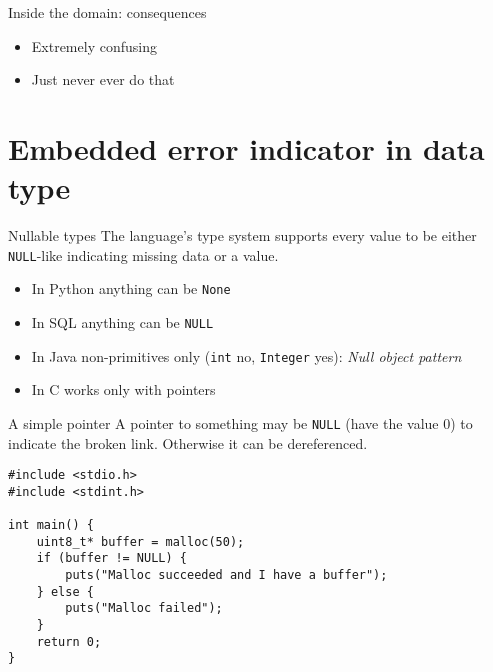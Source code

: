 \documentclass[aspectratio=169,14pt]{beamer}
\begin{document}
\begin{frame}[fragile]{Inside the domain: consequences}
\begin{itemize}
    \item[\bad] Extremely confusing
    \item[\bad] Just never ever do that
\end{itemize}
\end{frame}




\section{Embedded error indicator in data type}

\begin{frame}{Nullable types}
The language's type system supports every value to be either \texttt{NULL}-like indicating missing data or a value.

\begin{itemize}
    \item In Python anything can be \texttt{None}
    \item In SQL anything can be \texttt{NULL}
    \item In Java non-primitives only (\texttt{int} no, \texttt{Integer} yes): \textit{Null object pattern}
    \item In C works only with pointers
\end{itemize}
\end{frame}



\begin{frame}[fragile]{A simple pointer}
A pointer to something may be \texttt{NULL} (have the value 0) to indicate the broken link. Otherwise it can be dereferenced.

\begin{lstlisting}[style=cstyle]
#include <stdio.h>
#include <stdint.h>

int main() {
    uint8_t* buffer = malloc(50);
    if (buffer != NULL) {
        puts("Malloc succeeded and I have a buffer");
    } else {
        puts("Malloc failed");
    }
    return 0;
}
\end{lstlisting}
\end{frame}
\end{document}
